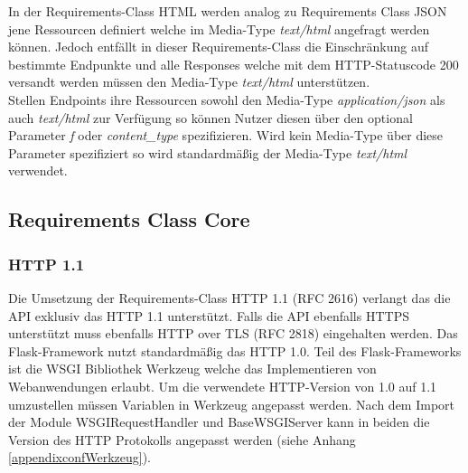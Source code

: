 In der Requirements-Class HTML werden analog zu Requirements Class JSON jene Ressourcen definiert welche im Media-Type \textit{text/html} angefragt werden können. Jedoch
entfällt in dieser Requirements-Class die Einschränkung auf bestimmte Endpunkte und alle Responses welche mit dem HTTP-Statuscode 200 versandt werden müssen den 
Media-Type \textit{text/html} unterstützen.\\
Stellen Endpoints ihre Ressourcen sowohl den Media-Type \textit{application/json} als auch \textit{text/html} zur Verfügung so können Nutzer diesen über den optional Parameter
\textit{f} oder \textit{content\_type} spezifizieren. Wird kein Media-Type über diese Parameter spezifiziert so wird standardmäßig der Media-Type \textit{text/html} verwendet. \\


\subsection{Requirements Class Core}
\subsubsection{HTTP 1.1}
Die Umsetzung der Requirements-Class HTTP 1.1 (RFC 2616) verlangt das die API exklusiv das HTTP 1.1 unterstützt. 
Falls die API ebenfalls HTTPS unterstützt muss ebenfalls HTTP over TLS (RFC 2818) eingehalten werden. 
Das Flask-Framework nutzt standardmäßig das HTTP 1.0. Teil des Flask-Frameworks ist die WSGI Bibliothek Werkzeug welche
das Implementieren von Webanwendungen erlaubt. Um die verwendete HTTP-Version von 1.0 auf 1.1 umzustellen müssen Variablen 
in Werkzeug angepasst werden. Nach dem Import der Module WSGIRequestHandler und BaseWSGIServer kann in beiden die 
Version des HTTP Protokolls angepasst werden (siehe Anhang \ref{appendixconfWerkzeug}). 

